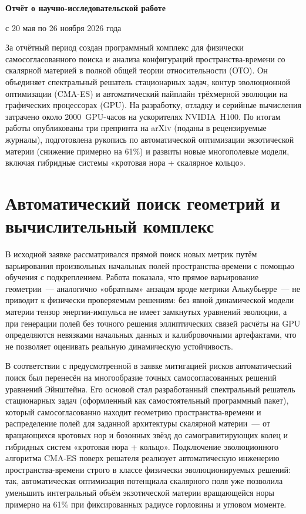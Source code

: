 \documentclass[11pt,a4paper]{article}
\begin{document}

\begin{center}
  {\large\bfseries Отчёт о научно-исследовательской работе\par}
  \vspace{3pt}
  {с 20 мая по 26 ноября 2026 года\par}
\end{center}
\vspace{-3pt}

За отчётный период создан программный комплекс для физически самосогласованного поиска и анализа конфигураций пространства-времени со скалярной материей в полной общей теории относительности (ОТО). Он объединяет спектральный решатель стационарных задач, контур эволюционной оптимизации (CMA-ES) и автоматический пайплайн трёхмерной эволюции на графических процессорах (GPU). На разработку, отладку и серийные вычисления затрачено около 2000~GPU-часов на ускорителях NVIDIA~H100. По итогам работы опубликованы три препринта на arXiv (поданы в рецензируемые журналы), подготовлена рукопись по автоматической оптимизации экзотической материи (снижение примерно на 61\%) и развиты новые многополевые модели, включая гибридные системы «кротовая нора + скалярное кольцо».

\section*{Автоматический поиск геометрий и вычислительный комплекс}

В исходной заявке рассматривался прямой поиск новых метрик путём варьирования произвольных начальных полей пространства-времени с помощью обучения с подкреплением. Работа показала, что прямое варьирование геометрии~--- аналогично «обратным» анзацам вроде метрики Алькубьерре~--- не приводит к физически проверяемым решениям: без явной динамической модели материи тензор энергии-импульса не имеет замкнутых уравнений эволюции, а при генерации полей без точного решения эллиптических связей расчёты на GPU определяются невязками начальных данных и калибровочными артефактами, что не позволяет оценивать реальную динамическую устойчивость.

В соответствии с предусмотренной в заявке митигацией рисков автоматический поиск был перенесён на многообразие точных самосогласованных решений уравнений Эйнштейна. Его основой стал разработанный спектральный решатель стационарных задач (оформленный как самостоятельный программный пакет), который самосогласованно находит геометрию пространства-времени и распределение полей для заданной архитектуры скалярной материи~--- от вращающихся кротовых нор и бозонных звёзд до самогравитирующих колец и гибридных систем «кротовая нора + кольцо». Подключение эволюционного алгоритма CMA-ES поверх решателя реализует автоматическую инженерию пространства-времени строго в классе физически эволюционируемых решений: так, автоматическая оптимизация потенциала скалярного поля уже позволила уменьшить интегральный объём экзотической материи вращающейся норы примерно на 61\% при фиксированных радиусе горловины и угловом моменте.
\end{document}
